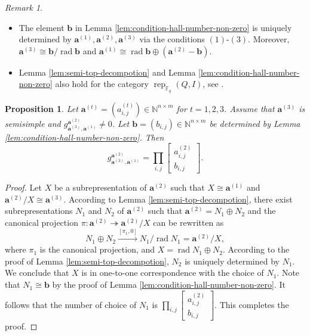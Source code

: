 \documentclass[12pt]{amsart}
\newtheorem{proposition}[theorem]{Proposition}
\theoremstyle{remark}
\newtheorem{remark}[theorem]{Remark}
\theoremstyle{definition}
\numberwithin{equation}{section}
\newcommand{\sqbinom}[2]{\begin{bmatrix} #1 \\ #2 \end{bmatrix}}
\begin{document}
\begin{remark}
\begin{itemize}
    \item[(1)]  The element  $\mathbf{b}$ in Lemma \ref{lem:condition-hall-number-non-zero} is uniquely determined by $\mathbf{a}^{(1)},\mathbf{a}^{(2)},\mathbf{a}^{(3)}$ via the conditions $(1)$-$(3)$. Moreover, $\mathbf{a}^{(3)}\cong \mathbf{b}/\operatorname{rad} \mathbf{b}$ and $\mathbf{a}^{(1)}\cong \operatorname{rad} \mathbf{b}\oplus (\mathbf{a}^{(2)}-\mathbf{b})$.
    \item[(2)]  Lemma \ref{lem:semi-top-decompotion} and Lemma \ref{lem:condition-hall-number-non-zero} also hold for the category $\operatorname{rep}_{\mathbb{F}_q}(Q,I)$, see \cite[Lemmas 3.1, 3.2]{G95}.
\end{itemize}
   
\end{remark}


\begin{proposition}
\label{pro:semi-hall-number-F_1}
Let $\mathbf{a}^{(t)}=(a_{i,j}^{(t)})\in \mathbb{N}^{n\times m}$ for $t=1,2,3$. Assume that $\mathbf{a}^{(3)}$ is semisimple and $g_{\mathbf{a}^{(3)},\mathbf{a}^{(1)}}^{\mathbf{a}^{(2)}}\neq 0$. Let $\mathbf{b}=(b_{i,j})\in \mathbb{N}^{n\times m}$ be determined by Lemma \ref{lem:condition-hall-number-non-zero}.
Then 
 \[
 g_{\mathbf{a}^{(3)},\mathbf{a}^{(1)}}^{\mathbf{a}^{(2)}}=\prod_{i,j}\sqbinom{a_{i,j}^{(2)}}{b_{i,j}}.
 \]
\end{proposition}

\begin{proof}
    Let $X$ be a subrepresentation of $\mathbf{a}^{(2)}$ such that $X\cong \mathbf{a}^{(1)}$ and $\mathbf{a}^{(2)}/X\cong \mathbf{a}^{(3)}$. According to Lemma \ref{lem:semi-top-decompotion}, there exist  subrepresentations $N_1$ and $N_2$ of $\mathbf{a}^{(2)}$  such that $\mathbf{a}^{(2)}=N_1\oplus N_2$ and the canonical projection $\pi:\mathbf{a}^{(2)}\twoheadrightarrow \mathbf{a}^{(2)}/X$ can be rewritten as
    \[
    N_1\oplus N_2\xrightarrow{[\pi_1,0]} N_1/\operatorname{rad} N_1=\mathbf{a}^{(2)}/X,
    \]
    where $\pi_1$ is the canonical projection, and $X=\operatorname{rad} N_1\oplus N_2$. According to the proof of Lemma \ref{lem:semi-top-decompotion},  $N_2$ is uniquely determined by $N_1$. We conclude that $X$ is in one-to-one correspondence with the choice of $N_1$. Note that $N_1\cong \mathbf{b}$ by the proof of Lemma \ref{lem:condition-hall-number-non-zero}. It follows that the number of choice of $N_1$ is $\prod_{i,j}\sqbinom{a_{i,j}^{(2)}}{b_{i,j}}$. This completes the proof.
\end{proof}
\end{document}
